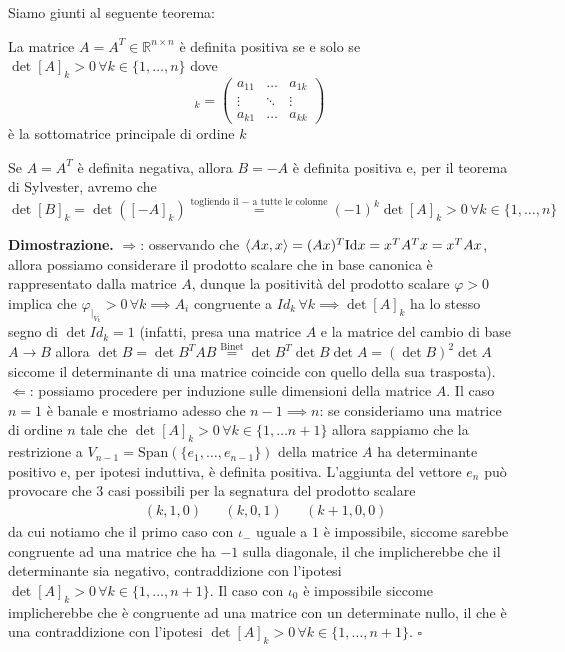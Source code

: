 \vspace{0.5cm}

Siamo giunti al seguente teorema:

\begin{theorem}[\textcolor{blue}{criterio di Sylvester}]
La matrice $A=A^{T} \in \mathbb{R}^{n \times n}$ è definita positiva se e solo se $\det{[A]}_k > 0 \, \forall k \in \{1, \ldots, n\}$ dove
\begin{equation*}
[A]_k = \begin{pmatrix}
a_{11} & \ldots & a_{1k} \\
\vdots & \ddots & \vdots \\
a_{k1} & \ldots & a_{kk}
\end{pmatrix}
\end{equation*}
è la sottomatrice principale di ordine $k$
\end{theorem}

\begin{remark}
Se $A=A^{T}$ è definita negativa, allora $B=-A$ è definita positiva e, per il teorema di Sylvester, avremo che
$$
\det{[B]_k} = \det{([-A]_k)} \stackrel{\text{togliendo il } - \text{ a tutte le colonne}}{=} (-1)^k \det{[A]_k} > 0 \, \forall k \in \{1, \ldots, n \}
$$
\end{remark}

\noindent \textbf{Dimostrazione. }
$\boxed{\Rightarrow}$: osservando che $\langle Ax, x \rangle = (Ax)^T \text{Id} x = x^T A^T x = x^T A x$, allora possiamo considerare il prodotto scalare che in base canonica è rappresentato dalla matrice $A$, dunque la positività del prodotto scalare $\varphi > 0$ implica che $\varphi_{|_{V_k}} > 0 \, \forall k \implies A_i$ congruente a $Id_k \, \forall k \implies \det{[A]_k}$ ha lo stesso segno di $\det{Id_k} = 1$ (infatti, presa una matrice $A$ e la matrice del cambio di base $A \to B$ allora $\det{B} = \det{B^T A B} \stackrel{\text{Binet}}{=} \det{B^T}\det{B}\det{A} = (\det{B})^2 \det{A}$ siccome il determinante di una matrice coincide con quello della sua trasposta). \\
$\boxed{\Leftarrow}$: possiamo procedere per induzione sulle dimensioni della matrice $A$. Il caso $n=1$ è banale e mostriamo adesso che $n-1 \implies n$: se consideriamo una matrice di ordine $n$ tale che $\det{[A]_{k}} > 0 \, \forall k \in \{1, \ldots n+1 \}$ allora sappiamo che la restrizione a $V_{n-1} = \text{Span}(\{e_1, \ldots, e_{n-1} \})$ della matrice $A$ ha determinante positivo e, per ipotesi induttiva, è definita positiva. L'aggiunta del vettore $e_n$ può provocare che $3$ casi possibili per la segnatura del prodotto scalare
\[\begin{aligned}
&(k, 1, 0) & &(k, 0, 1) & &(k+1, 0, 0)
\end{aligned}\]
da cui notiamo che il primo caso con $\iota_-$ uguale a $1$ è impossibile, siccome sarebbe congruente ad una matrice che ha $-1$ sulla diagonale, il che implicherebbe che il determinante sia negativo, contraddizione con l'ipotesi $\det{[A]_k} > 0 \, \forall k \in \{1, \ldots, n+1\}$. Il caso con $\iota_0$ è impossibile siccome implicherebbe che è congruente ad una matrice con un determinate nullo, il che è una contraddizione con l'ipotesi $\det{[A]_k} > 0 \, \forall k \in \{1, \ldots, n+1 \}$.
\hfill $\square$

